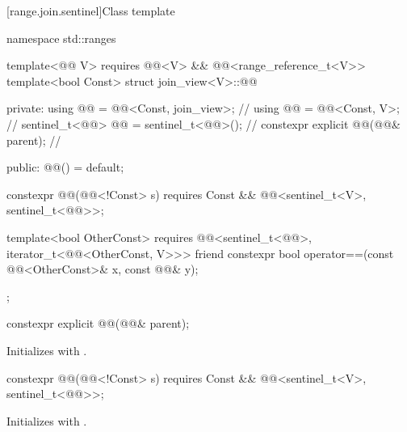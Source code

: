 [range.join.sentinel]{Class template }

%
\begin{codeblock}
namespace std::ranges {
  template<@@ V>
    requires @@<V> && @@<range_reference_t<V>>
  template<bool Const>
  struct join_view<V>::@@ {
  private:
    using @@ = @@<Const, join_view>;       // \expos
    using @@ = @@<Const, V>;                 // \expos
    sentinel_t<@@> @@ = sentinel_t<@@>();         // \expos
    constexpr explicit @@(@@& parent);        //  \expos

  public:
    @@() = default;

    constexpr @@(@@<!Const> s)
      requires Const && @@<sentinel_t<V>, sentinel_t<@@>>;

    template<bool OtherConst>
      requires @@<sentinel_t<@@>, iterator_t<@@<OtherConst, V>>>
    friend constexpr bool operator==(const @@<OtherConst>& x, const @@& y);
  };
}
\end{codeblock}

%
\begin{itemdecl}
constexpr explicit @@(@@& parent);
\end{itemdecl}

\begin{itemdescr}
\pnum
\effects
Initializes  with .
\end{itemdescr}

%
\begin{itemdecl}
constexpr @@(@@<!Const> s)
  requires Const && @@<sentinel_t<V>, sentinel_t<@@>>;
\end{itemdecl}

\begin{itemdescr}
\pnum
\effects
Initializes  with .
\end{itemdescr}

